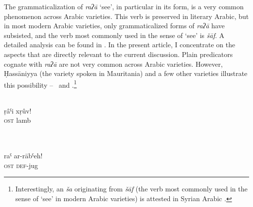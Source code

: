 \documentclass[output=paper]{langsci/langscibook}
\begin{document}
The grammaticalization of \textit{raʔā} ‘see’, in particular in its  form, is a very common phenomenon across Arabic varieties. This verb is preserved in literary Arabic, but in most modern Arabic varieties, only grammaticalized forms of \textit{raʔā} have subsisted, and the verb most commonly used in the sense of ‘see’ is \textit{šāf}. A detailed analysis can be found in \citet{Taine-Cheikh2013}. In the present article, I concentrate on the aspects that are directly relevant to the current discussion.
  Plain  predicators cognate with \textit{raʔā} are not very common across Arabic varieties. However, Ḥassāniyya (the variety spoken in Mauritania) and a few other varieties illustrate this possibility –  \ and .\footnote{Interestingly, an   \textit{ša} originating from \textit{šāf} (the verb most commonly used in the sense of ‘see’ in modern Arabic varieties) is attested in Syrian Arabic  \citep[115]{Stowasser1964}.}

  \ea
    \label{ex:creissels:8}    
   \\   
  \gll ṛâˤi  xṛûv!  \\
   {\textsc{ost}}  {lamb}  \\
  \\ 
\z


\ea
    \label{ex:creissels:9}    
   \\   
  \gll raˤ ar-rābˤeh!  \\
   \textsc{ost}  \textsc{def}-jug  \\
\z
\end{document}
